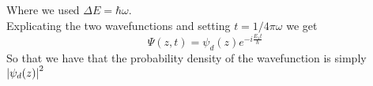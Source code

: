 \documentclass[../qm.tex]{subfiles}
\begin{document}
	Where we used $\Delta E=\hbar\omega$.\\
	Explicating the two wavefunctions and setting $t=1/4\pi\omega$ we get
	\begin{equation}
		\Psi(z,t)=\psi_d(z)e^{-i\frac{E_1t}{\hbar}}
		\label{eq:halfnutimenh3}
	\end{equation}
	So that we have that the probability density of the wavefunction is simply $\abs{\psi_d(z)}^2$
\end{document}
